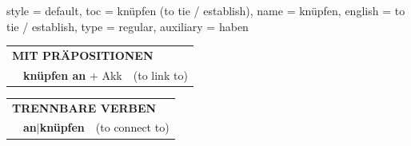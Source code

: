 \begin{verbentry}{
  style = {default},
  toc = {knüpfen (to tie / establish)},
  name = {knüpfen},
  english = {to tie / establish},
  type = {regular},
  auxiliary = {haben}
}
\vspace{10pt}

\begin{tabular}{lll}
\multicolumn{3}{l}{\textbf{MIT PRÄPOSITIONEN}}\\
& \textbf{knüpfen an} + Akk & (to link to)\\
\end{tabular}
\hfill
\begin{tabular}{lll}
\multicolumn{3}{l}{\textbf{TRENNBARE VERBEN}}\\
& \textbf{an$|$knüpfen} & (to connect to)\\
\end{tabular}

\vspace{-5pt}
\end{verbentry}

